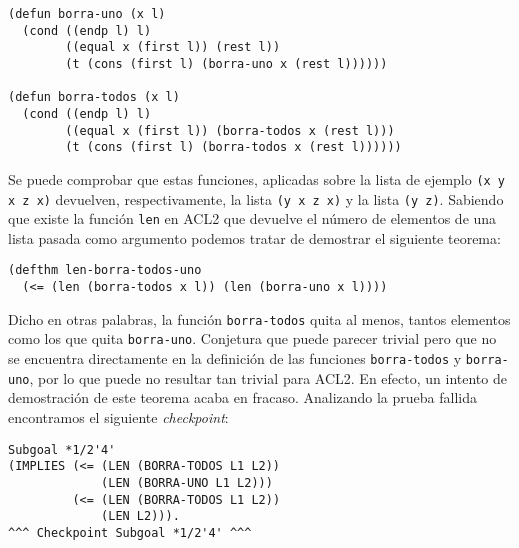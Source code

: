 \documentclass[a4paper,10pt]{article}
\begin{document}
\par\vspace{10pt}

\begin{lstlisting}[language=clips]
(defun borra-uno (x l)
  (cond ((endp l) l)
        ((equal x (first l)) (rest l))
        (t (cons (first l) (borra-uno x (rest l))))))

(defun borra-todos (x l)
  (cond ((endp l) l)
        ((equal x (first l)) (borra-todos x (rest l)))
        (t (cons (first l) (borra-todos x (rest l))))))
\end{lstlisting}

\par\vspace{10pt}

Se puede comprobar que estas funciones, aplicadas sobre la lista de ejemplo \texttt{(x y x z x)} devuelven, respectivamente, la lista \texttt{(y x z x)} y la lista \texttt{(y z)}. Sabiendo que existe la función \texttt{len} en ACL2 que devuelve el número de elementos de una lista pasada como argumento podemos tratar de demostrar el siguiente teorema:

\par\vspace{10pt}

\begin{lstlisting}[language=clips]
(defthm len-borra-todos-uno
  (<= (len (borra-todos x l)) (len (borra-uno x l))))
\end{lstlisting}

\par\vspace{10pt}

Dicho en otras palabras, la función \texttt{borra-todos} quita al menos, tantos elementos como los que quita \texttt{borra-uno}. Conjetura que puede parecer trivial pero que no se encuentra directamente en la definición de las funciones \texttt{borra-todos} y \texttt{borra-uno}, por lo que puede no resultar tan trivial para ACL2. En efecto, un intento de demostración de este teorema acaba en fracaso. Analizando la prueba fallida encontramos el siguiente \emph{checkpoint}:

\par\vspace{10pt}

\begin{lstlisting}[language=salidaroja]
Subgoal *1/2'4'
(IMPLIES (<= (LEN (BORRA-TODOS L1 L2))
             (LEN (BORRA-UNO L1 L2)))
         (<= (LEN (BORRA-TODOS L1 L2))
             (LEN L2))).
^^^ Checkpoint Subgoal *1/2'4' ^^^
\end{lstlisting}
\end{document}
